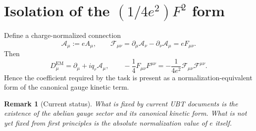 \documentclass[11pt,a4paper]{article}
\newtheorem{remark}[proposition]{Remark}
\begin{document}
\section{Isolation of the \texorpdfstring{$(1/4e^2)F^2$}{(1/4e^2)F^2} form}
Define a charge-normalized connection
\begin{equation}
\mathcal{A}_\mu:=eA_\mu,
\qquad
\mathcal{F}_{\mu\nu}=\partial_\mu\mathcal{A}_\nu-\partial_\nu\mathcal{A}_\mu=eF_{\mu\nu}.
\end{equation}
Then
\begin{equation}
D^{\mathrm{EM}}_\mu=\partial_\mu+i q_r\mathcal{A}_\mu,
\qquad
-\frac14 F_{\mu\nu}F^{\mu\nu}=-\frac{1}{4e^2}\mathcal{F}_{\mu\nu}\mathcal{F}^{\mu\nu}.
\end{equation}
Hence the coefficient required by the task is present as a normalization-equivalent form
of the canonical gauge kinetic term.

\begin{remark}[Current status]
What is fixed by current UBT documents is the existence of the abelian gauge sector and
its canonical kinetic form. What is not yet fixed from first principles is the absolute
normalization value of $e$ itself.
\end{remark}
\end{document}

